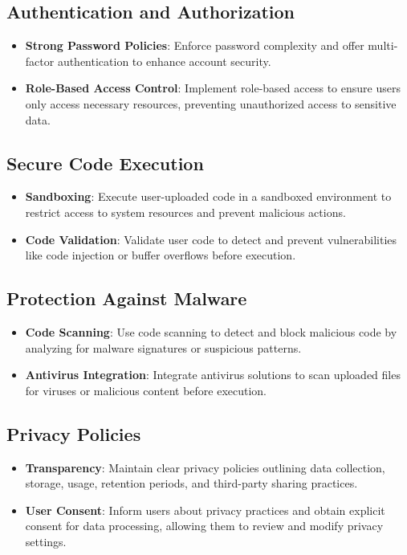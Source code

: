 \subsection{Authentication and Authorization}
\begin{itemize}
	\item \textbf{Strong Password Policies}: Enforce password complexity and offer multi-factor authentication to enhance account security.
	\item \textbf{Role-Based Access Control}: Implement role-based access to ensure users only access necessary resources, preventing unauthorized access to sensitive data.
\end{itemize}

\subsection{Secure Code Execution}
\begin{itemize}
	\item \textbf{Sandboxing}: Execute user-uploaded code in a sandboxed environment to restrict access to system resources and prevent malicious actions.
	\item \textbf{Code Validation}: Validate user code to detect and prevent vulnerabilities like code injection or buffer overflows before execution.
\end{itemize}

\subsection{Protection Against Malware}
\begin{itemize}
	\item \textbf{Code Scanning}: Use code scanning to detect and block malicious code by analyzing for malware signatures or suspicious patterns.
	\item \textbf{Antivirus Integration}: Integrate antivirus solutions to scan uploaded files for viruses or malicious content before execution.
\end{itemize}

\subsection{Privacy Policies}
\begin{itemize}
	\item \textbf{Transparency}: Maintain clear privacy policies outlining data collection, storage, usage, retention periods, and third-party sharing practices.
	\item \textbf{User Consent}: Inform users about privacy practices and obtain explicit consent for data processing, allowing them to review and modify privacy settings.
\end{itemize}

